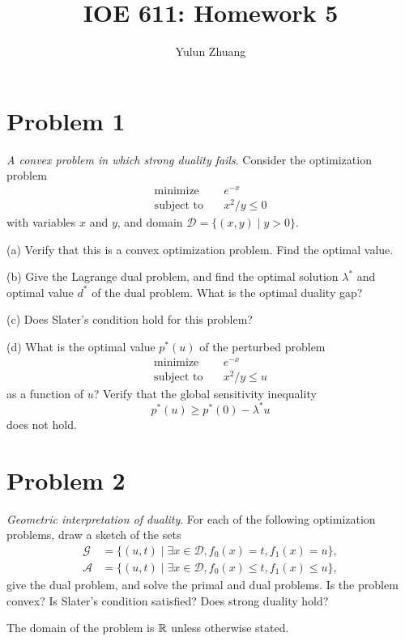 \documentclass[11pt]{article}
\begin{document}
\title{IOE 611: Homework 5}
\author{Yulun Zhuang}
\maketitle
\section*{Problem 1}
\textit{A convex problem in which strong duality fails}. Consider the optimization problem
\begin{align*}
  \text{minimize} \quad & e^{-x}\\
  \text{subject to} \quad & x^2/y \leq 0
\end{align*}
with variables $x$ and $y$, and domain $\mathcal{D} = \{(x, y)\mid y>0\}$.

(a) Verify that this is a convex optimization problem. Find the optimal value.

(b) Give the Lagrange dual problem, and find the optimal solution $\lambda^*$ and optimal value $d^*$ of the dual problem. What is the optimal duality gap?

(c) Does Slater's condition hold for this problem?

(d) What is the optimal value $p^*(u)$ of the perturbed problem
\begin{align*}
  \text{minimize} \quad & e^{-x}\\
  \text{subject to} \quad & x^2/y \leq u
\end{align*}
as a function of $u$? Verify that the global sensitivity inequality
\[
  p^*(u) \geq p^*(0) - \lambda^* u
\]
does not hold.



\clearpage
\section*{Problem 2}
\textit{Geometric interpretation of duality}. For each of the following optimization problems, draw a sketch of the sets
\begin{align*}
  \mathcal{G} &= \{(u, t)\mid \exists x\in \mathcal{D}, f_0(x) = t, f_1(x) = u\},\\
  \mathcal{A} &= \{(u, t)\mid \exists x\in \mathcal{D}, f_0(x) \leq t, f_1(x) \leq u\},
\end{align*}
give the dual problem, and solve the primal and dual problems. Is the problem convex? Is Slater's condition satisfied? Does strong duality hold?

The domain of the problem is ${{\mathbb{R}}}$ unless otherwise stated.
\end{document}
